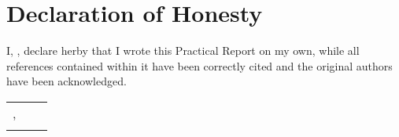 \chapter*{Declaration of Honesty}

I, \studentname, declare herby that I wrote this Practical Report on my own, while all references contained within it have been correctly cited and the original authors have been acknowledged.

\begin{center}
	\vspace{1.4cm}
	\begin{tabular}{p{6cm} p{1cm} p{5cm}}
		\handoverdate, \city \\
		\cline{3-3}
		\null & \null & \studentname
	\end{tabular}
\end{center}
